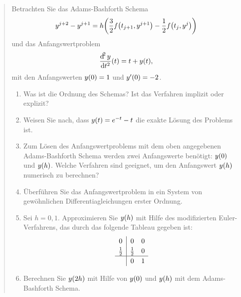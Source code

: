 \documentclass{exercise}
\begin{document}
    \begin{quote}
        Betrachten Sie das Adams-Bashforth Schema
        \[
            y^{j + 2} - y^{j + 1} = h\parentheses*{\frac{3}{2}f\parentheses*{t_{j + 1}, y^{j + 1}} - \frac{1}{2}f\parentheses*{t_j, y^j}}
        \]
        und das Anfangswertproblem
        \[
            \frac{\d^2 y}{\d t^2}\parentheses*{t} = t + y\parentheses*{t},
        \]
        mit den Anfangswerten \(y\parentheses*{0} = 1\) und \(y'\parentheses*{0} = -2\).
        \begin{enumerate}
            \item Was ist die Ordnung des Schemas?
            Ist das Verfahren implizit oder explizit?
            \item Weisen Sie nach, dass \(y\parentheses*{t} =e^{-t} - t\) die exakte Lösung des Problems ist.
            \item Zum Lösen des Anfangswertproblems mit dem oben angegebenen Adams-Bashforth Schema werden zwei Anfangswerte benötigt: \(y\parentheses*{0}\) und \(y\parentheses*{h}\).
            Welche Verfahren sind geeignet, um den Anfangswert \(y\parentheses*{h}\) numerisch zu berechnen?
            \item Überführen Sie das Anfangswertproblem in ein System von gewöhnlichen Differentiagleichungen erster Ordnung.
            \item Sei \(h = 0,1\).
            Approximieren Sie \(y\parentheses*{h}\) mit Hilfe des modifizierten Euler-Verfahrens, das durch das folgende Tableau gegeben ist:
            \[
                \renewcommand\arraystretch{1.2}
				\begin{array}{c|cc}
					0 & 0 & 0\\
					\frac{1}{2} & \frac{1}{2} & 0\\
					\hline
					& 0 & 1
				\end{array}
            \]
            \item Berechnen Sie \(y\parentheses*{2h}\) mit Hilfe von \(y\parentheses*{0}\) und \(y\parentheses*{h}\) mit dem Adams-Bashforth Schema.
        \end{enumerate}
    \end{quote}
\end{document}
